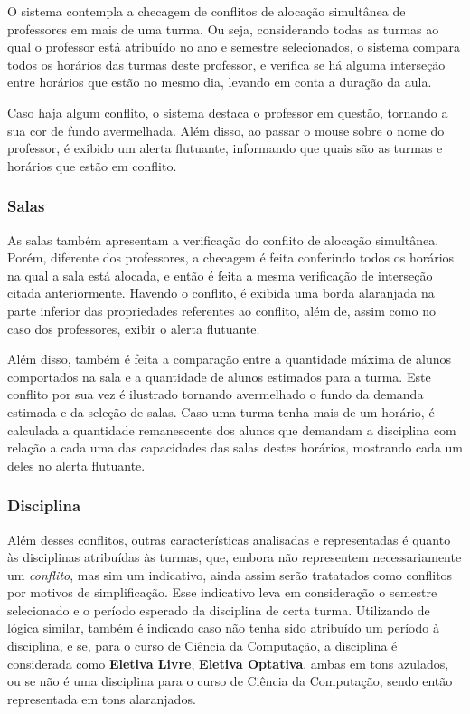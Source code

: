 O sistema contempla a checagem de conflitos de alocação simultânea de professores em mais de uma turma. Ou seja, considerando todas as turmas ao qual o professor está atribuído no ano e semestre selecionados, o sistema compara todos os horários das turmas deste professor, e verifica se há alguma interseção entre horários que estão no mesmo dia, levando em conta a duração da aula.

Caso haja algum conflito, o sistema destaca o professor em questão, tornando a sua cor de fundo avermelhada. Além disso, ao passar o mouse sobre o nome do professor, é exibido um alerta flutuante, informando que quais são as turmas e horários que estão em conflito.

\subsubsection{Salas}

As salas também apresentam a verificação do conflito de alocação simultânea. Porém, diferente dos professores, a checagem é feita conferindo todos os horários na qual a sala está alocada, e então é feita a mesma verificação de interseção citada anteriormente. Havendo o conflito, é exibida uma borda alaranjada na parte inferior das propriedades referentes ao conflito, além de, assim como no caso dos professores, exibir o alerta flutuante.

Além disso, também é feita a comparação entre a quantidade máxima de alunos comportados na sala e a quantidade de alunos estimados para a turma. Este conflito por sua vez é ilustrado tornando avermelhado o fundo da demanda estimada e da seleção de salas. Caso uma turma tenha mais de um horário, é calculada a quantidade remanescente dos alunos que demandam a disciplina com relação a cada uma das capacidades das salas destes horários, mostrando cada um deles no alerta flutuante.

\subsubsection{Disciplina}

Além desses conflitos, outras características analisadas e representadas é quanto às disciplinas atribuídas às turmas, que, embora não representem necessariamente um \textit{conflito}, mas sim um indicativo, ainda assim serão tratatados como conflitos por motivos de simplificação. Esse indicativo leva em consideração o semestre selecionado e o período esperado da disciplina de certa turma. Utilizando de lógica similar, também é indicado caso não tenha sido atribuído um período à disciplina, e se, para o curso de Ciência da Computação, a disciplina é considerada como \textbf{Eletiva Livre}, \textbf{Eletiva Optativa}, ambas em tons azulados, ou se não é uma disciplina para o curso de Ciência da Computação, sendo então representada em tons alaranjados.

